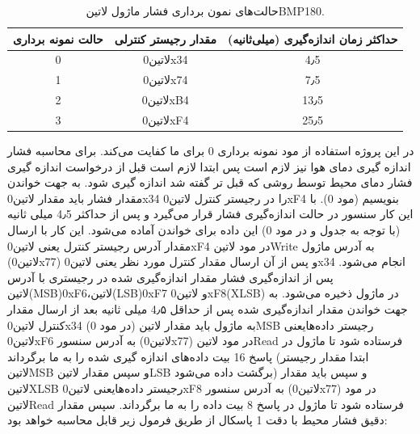 \begin{table}[!h]
	\centering
	\caption{حالت‌های نمون برداری فشار ماژول ‌لاتین{BMP180}.}
	\label{table:BMP180persure}
	\begin{tabular}{ccc}
		حالت نمونه برداری & مقدار رجیستر کنترلی & حداکثر زمان اندازه‌گیری (میلی‌ثانیه)\\
		\hline
		0 & ‌لاتین{0x34} & 4٫5 \\
		1 & ‌لاتین{0x74} & 7٫5 \\
		2 & ‌لاتین{0xB4} & 13٫5 \\
		3 & ‌لاتین{0xF4} & 25٫5 \\
		
	\end{tabular}
\end{table}

در این پروژه استفاده از مود نمونه برداری 0 برای ما کفایت می‌کند. برای محاسبه فشار اندازه گیری دمای هوا نیز لازم است پس ابتدا لازم است قبل از درخواست اندازه گیری فشار دمای محیط توسط روشی که قبل تر گفته شد اندازه گیری شود. به جهت خواندن مقدار فشار باید مقدار ‌لاتین{0x34} را در رجیستر کنترل ‌لاتین{0xF4} بنویسیم (مود 0). با این کار سنسور در حالت اندازه‌گیری فشار قرار می‌گیرد و پس از حداکثر 4٫5 میلی ثانیه (با توجه به جدول  و در مود 0) این داده برای خواندن آماده ‌می‌شود. این کار با ارسال مقدار آدرس رجیستر کنترل یعنی ‌لاتین{0xF4} در مود ‌لاتین{Write} به آدرس ماژول (‌لاتین{0x77}) و پس از آن ارسال مقدار کنترل مورد نظر یعنی ‌لاتین{0x34} انجام می‌شود. پس از اندازه‌گیری فشار مقدار اندازه‌گیری شده در رجیستری با آدرس ‌لاتین{(MSB)0xF6}،‌لاتین{(LSB)0xF7} و ‌لاتین{0xF8(XLSB)} در ماژول ذخیره می‌شود. به جهت خواندن مقدار اندازه‌گیری شده پس از حداقل 4٫۵ میلی ثانیه بعد از ارسال مقدار کنترل ‌لاتین{0x34} (در مود 0) به ماژول باید مقدار ‌لاتین{MSB} رجیستر داده‌هایعنی ‌لاتین{0xF6} به آدرس سنسور (‌لاتین{0x77}) در مود ‌لاتین{Read} فرستاده شود تا ماژول در پاسخ 16 بیت داده‌های اندازه گیری شده را به ما برگرداند (ابتدا مقدار رجیستر ‌لاتین{MSB} و سپس مقدار ‌لاتین{LSB} برگشت داده می‌شود) و سپس باید مقدار ‌لاتین{XLSB} رجیستر داده‌هایعنی ‌لاتین{0xF8} به آدرس سنسور (‌لاتین{0x77}) در مود ‌لاتین{Read} فرستاده شود تا ماژول در پاسخ 8 بیت داده‌ را به ما برگرداند. سپس مقدار دقیق فشار محیط با دقت 1 پاسکال از طریق فرمول زیر قابل محاسبه خواهد بود:

